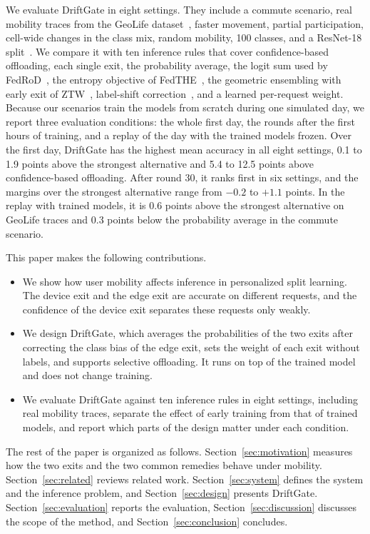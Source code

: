 We evaluate DriftGate in eight settings. They include a commute scenario, real mobility traces from the GeoLife dataset~\cite{zheng2010geolife}, faster movement, partial participation, cell-wide changes in the class mix, random mobility, 100 classes, and a ResNet-18 split~\cite{he2016resnet}. We compare it with ten inference rules that cover confidence-based offloading, each single exit, the probability average, the logit sum used by FedRoD~\cite{chen2022fedrod}, the entropy objective of FedTHE~\cite{jiang2023fedthe}, the geometric ensembling with early exit of ZTW~\cite{wolczyk2021ztw}, label-shift correction~\cite{saerens2002adjusting}, and a learned per-request weight. Because our scenarios train the models from scratch during one simulated day, we report three evaluation conditions: the whole first day, the rounds after the first hours of training, and a replay of the day with the trained models frozen. Over the first day, DriftGate has the highest mean accuracy in all eight settings, 0.1 to 1.9 points above the strongest alternative and 5.4 to 12.5 points above confidence-based offloading. After round 30, it ranks first in six settings, and the margins over the strongest alternative range from $-0.2$ to $+1.1$ points. In the replay with trained models, it is 0.6 points above the strongest alternative on GeoLife traces and 0.3 points below the probability average in the commute scenario. 

This paper makes the following contributions.
\begin{itemize}
    \item We show how user mobility affects inference in personalized split learning. The device exit and the edge exit are accurate on different requests, and the confidence of the device exit separates these requests only weakly.
    \item We design DriftGate, which averages the probabilities of the two exits after correcting the class bias of the edge exit, sets the weight of each exit without labels, and supports selective offloading. It runs on top of the trained model and does not change training.
    \item We evaluate DriftGate against ten inference rules in eight settings, including real mobility traces, separate the effect of early training from that of trained models, and report which parts of the design matter under each condition.
\end{itemize}

The rest of the paper is organized as follows. Section~\ref{sec:motivation} measures how the two exits and the two common remedies behave under mobility. Section~\ref{sec:related} reviews related work. Section~\ref{sec:system} defines the system and the inference problem, and Section~\ref{sec:design} presents DriftGate. Section~\ref{sec:evaluation} reports the evaluation, Section~\ref{sec:discussion} discusses the scope of the method, and Section~\ref{sec:conclusion} concludes.
